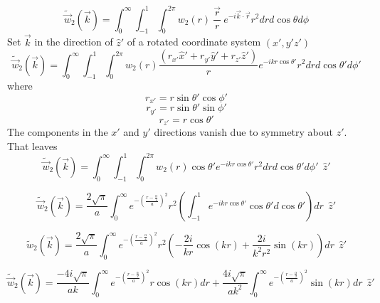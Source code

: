 \documentclass[double,12pt]{beavtex}
\begin{document}
\begin{equation}{\widetilde{\vec{w}}_2(\vec{k})=\int_{0}^{\infty}\int_{-1}^{1}\int_{0}^{2\pi}w_2(r){~}\frac{\vec{r}}{r}{~}e^{-i\vec{k}\cdot{\vec{r}}}r^2d{r}d{\cos\theta}d{\phi}}\end{equation}
Set $\vec{k}$ in the direction of $\hat{z}'$ of a rotated coordinate system $(x',y'z')$ 
\begin{equation}{\widetilde{\vec{w}}_2(\vec{k})=\int_{0}^{\infty}\int_{-1}^{1}\int_{0}^{2\pi}w_2(r)\frac{(r_{x'}\hat{x}'+r_{y'}\hat{y}'+r_{z'}\hat{z}')}{r}e^{-ikr\cos\theta'}r^2d{r}d{\cos\theta'}d{\phi'}}\end{equation}
where 
\begin{displaymath}{r_{x'}=r\sin\theta'\cos\phi'}\end{displaymath}
\begin{displaymath}{r_{y'}=r\sin\theta'\sin\phi'}\end{displaymath}
\begin{displaymath}{r_{z'}=r\cos\theta'}\end{displaymath} 
The components in the $x'$ and $y'$ directions vanish due to symmetry about $z'$. That leaves
\begin{equation}{\widetilde{\vec{w}}_2(\vec{k})=\int_{0}^{\infty}\int_{-1}^{1}\int_{0}^{2\pi}w_2(r)\cos{\theta}'e^{-ikr\cos\theta'}r^2d{r}d{\cos\theta'}d{\phi'}{~~}\hat{z}'}\end{equation}

\begin{equation}{\widetilde{\vec{w}}_2(\vec{k})=\frac{2\sqrt{\pi}}{a}\int_{0}^{\infty}e^{-\left(\frac{r-\frac{\alpha}{2}}{a}\right)^2}r^2\left(\int_{-1}^{1}e^{-ikr\cos\theta'}\cos{\theta}'d{\cos\theta'}\right)d{r}{~~}\hat{z}'}\end{equation}

\begin{equation}{\widetilde{w}_2(\vec{k})=\frac{2\sqrt{\pi}}{a}\int_{0}^{\infty}e^{-\left(\frac{r-\frac{\alpha}{2}}{a}\right)^2}r^2\left(-\frac{2i}{kr}\cos(kr) + \frac{2i}{k^2r^2}\sin(kr)\right)d{r}{~~}\hat{z}'}\end{equation}

\begin{equation}{\widetilde{\vec{w}}_2(\vec{k})=\frac{-4i\sqrt{\pi}}{ak}\int_{0}^{\infty}e^{-\left(\frac{r-\frac{\alpha}{2}}{a}\right)^2}r\cos(kr)d{r} + \frac{4i\sqrt{\pi}}{ak^2}\int_{0}^{\infty}e^{-\left(\frac{r-\frac{\alpha}{2}}{a}\right)^2}\sin(kr)d{r}{~~}\hat{z}'}\end{equation}
\end{document}
